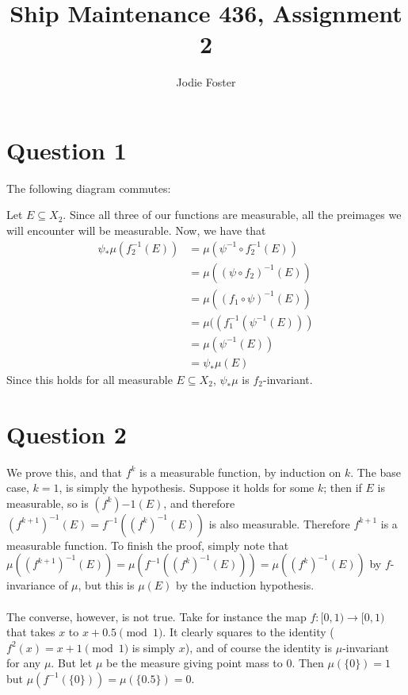 \documentclass[10pt,a4paper]{article}
\author{Jodie Foster}
\title{Ship Maintenance 436, Assignment 2}
\begin{document}
\maketitle
\section*{Question 1}
The following diagram commutes:
\begin{center}
\end{center}
Let $E\subseteq X_2$. Since all three of our functions are measurable, all the preimages we will encounter will be measurable. Now, we have that \begin{align*}\psi_*\mu(f_2^{-1}(E))&=\mu(\psi^{-1}\circ f_2^{-1}(E))\\&=\mu((\psi\circ f_2)^{-1}(E))\\&=\mu((f_1\circ \psi)^{-1}(E))\\&=\mu((f_1^{-1}(\psi^{-1}(E)))\\&=\mu(\psi^{-1}(E))\\&=\psi_*\mu (E)\end{align*}
Since this holds for all measurable $E\subseteq X_2$, $\psi_*\mu$ is $f_2$-invariant.
\section*{Question 2}
We prove this, and that $f^k$ is a measurable function, by induction on $k$. The base case, $k=1$, is simply the hypothesis. Suppose it holds for some $k$; then if $E$ is measurable, so is $(f^k){-1}(E)$, and therefore $(f^{k+1})^{-1}(E)=f^{-1}((f^k)^{-1}(E))$ is also measurable. Therefore $f^{k+1}$ is a measurable function. To finish the proof, simply note that $\mu((f^{k+1})^{-1}(E))=\mu(f^{-1}((f^k)^{-1}(E)))=\mu((f^k)^{-1}(E))$ by $f$-invariance of $\mu$, but this is $\mu(E)$ by the induction hypothesis.\\\\
The converse, however, is not true. Take for instance the map $f:[0,1)\to[0,1)$ that takes $x$ to $x+0.5\pmod{1}$. It clearly squares to the identity ($f^2(x)=x+1\pmod{1}$ is simply $x$), and of course the identity is $\mu$-invariant for any $\mu$. But let $\mu$ be the measure giving point mass to 0. Then $\mu(\{0\})=1$ but $\mu(f^{-1}(\{0\}))=\mu(\{0.5\})=0$.
\end{document}
